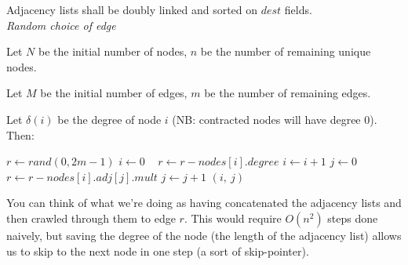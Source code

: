 \documentclass[a4paper]{article}
\begin{document}
Adjacency lists shall be doubly linked and sorted on $dest$ fields.
\\
\iffalse
\begin{tikzpicture}
\matrix (M) [matrix of nodes,
column sep=0pt,
row sep=0pt,
nodes={draw,fill=gray!20,minimum width=.5cm,outer sep=0pt,minimum
height=.7cm,anchor=center},
column 1/.style={minimum height=.8cm}]{
 \mbox{} &[2mm] <2, 3> & \mbox{} &[2mm] < \ 5, 13   > & $/$  &[2mm]   &   &[2mm]   & \\
 \mbox{} & <1, 2> & \mbox{} & <id, mul> & \mbox{}  & .. &  \mbox{} & .. & $/$  \\
 \mbox{}  & <.., ..>  & \mbox{} & <id, mul> & $/$  &   &   &   & \\
 \mbox{} & <.., ..> & \mbox{} & <id, mul> & \mbox{}  & .. & $/$  &   & \\
 \mbox{} & <.., ..> & \mbox{} & <id, mul> & \mbox{}  & .. & $/$  &   & \\
};
\foreach \i in {1,2,3,4,5}{
\path (M-\i-1) [late options={label=left:\i}];
\draw[->] (M-\i-1.center)--(M-\i-2.west);
\draw[->] (M-\i-3.center)--(M-\i-4.west);
}
\draw[->] (M-2-5.center)--(M-2-6.west);
\draw[->] (M-4-5.center)--(M-4-6.west);
\draw[->] (M-5-5.center)--(M-5-6.west);
\draw[->] (M-2-7.center)--(M-2-8.west);
\end{tikzpicture}
\fi


\noindent
\textit{Random choice of edge}

Let $N$ be the initial number of nodes, $n$ be the number of remaining unique nodes.

Let $M$ be the initial number of edges, $m$ be the number of remaining edges.

Let $\delta(i)$ be the degree of node $i$ (NB: contracted nodes will have degree 0). Then:\\

\begin{algorithmic}
\State $r \gets rand(0, 2m-1)$ 
\State $i \gets 0$ \
 
	\State $r \gets r - nodes[i].degree$
	\State $i \gets i + 1$
\EndWhile
\State $j \gets 0$
	\State $r \gets r - nodes[i].adj[j].mult$
	\State $j \gets j + 1$
\EndWhile
\State \Return $(i,\ j)$
\State
\EndFunction
\end{algorithmic}

You can think of what we're doing as having concatenated the adjacency lists and then crawled through them to edge $r$. This would require $O(n^2)$ steps done naively, but saving the degree of the node (the length of the adjacency list) allows us to skip to the next node in one step (a sort of skip-pointer).
\end{document}
